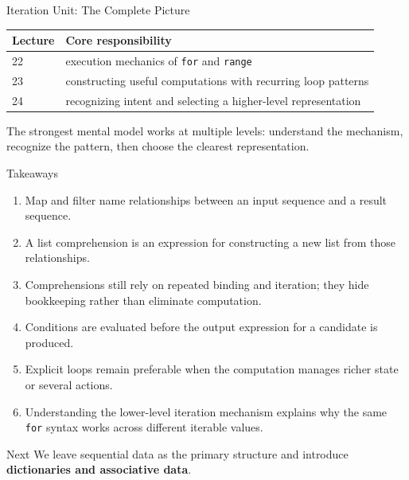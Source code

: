 \documentclass[aspectratio=169,10pt]{beamer}
\begin{document}
\begin{frame}{Iteration Unit: The Complete Picture}
  \begin{center}
    \renewcommand{\arraystretch}{1.32}
    \begin{tabular}{l|l}
      \textbf{Lecture} & \textbf{Core responsibility} \\\hline
      22 & execution mechanics of \texttt{for} and \texttt{range} \\
      23 & constructing useful computations with recurring loop patterns \\
      24 & recognizing intent and selecting a higher-level representation
    \end{tabular}
  \end{center}

  \begin{keyidea}
    The strongest mental model works at multiple levels: understand the mechanism, recognize the pattern, then choose the clearest representation.
  \end{keyidea}
\end{frame}

\begin{frame}{Takeaways}
  \begin{enumerate}
    \item Map and filter name relationships between an input sequence and a result sequence.
    \item A list comprehension is an expression for constructing a new list from those relationships.
    \item Comprehensions still rely on repeated binding and iteration; they hide bookkeeping rather than eliminate computation.
    \item Conditions are evaluated before the output expression for a candidate is produced.
    \item Explicit loops remain preferable when the computation manages richer state or several actions.
    \item Understanding the lower-level iteration mechanism explains why the same \texttt{for} syntax works across different iterable values.
  \end{enumerate}

  \begin{block}{Next}
    We leave sequential data as the primary structure and introduce \textbf{dictionaries and associative data}.
  \end{block}
\end{frame}
\end{document}
